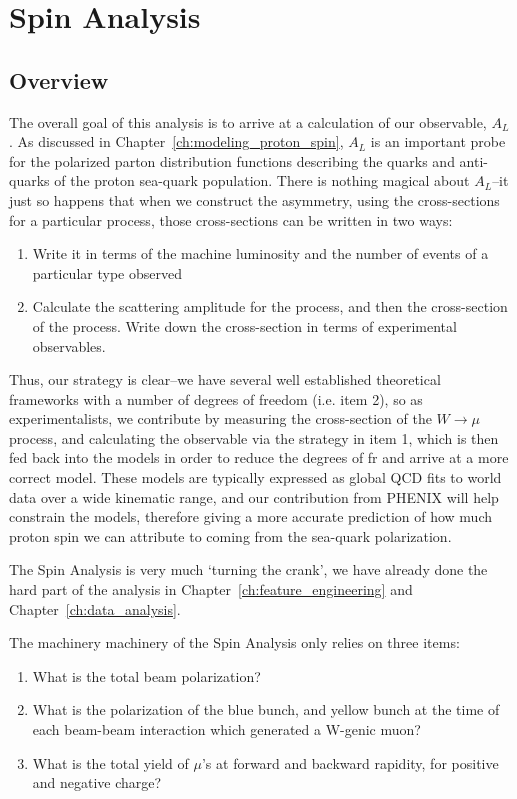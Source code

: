 \chapter{Spin Analysis}
\label{ch:spin_analysis}
\section{Overview}

The overall goal of this analysis is to arrive at a calculation of our
observable, $A_L$. As discussed in Chapter~\ref{ch:modeling_proton_spin}, $A_L$
is an important probe for the polarized parton distribution functions describing
the quarks and anti-quarks of the proton sea-quark population. There is nothing
magical about $A_L$--it just so happens that when we construct the asymmetry,
using the cross-sections for a particular process, those cross-sections can be
written in two ways:

\begin{enumerate}
  \item Write it in terms of the machine luminosity and the number of events of
    a particular type observed
  \item Calculate the scattering amplitude for the process, and then the
    cross-section of the process. Write down the cross-section in terms of
    experimental observables.
\end{enumerate}

Thus, our strategy is clear--we have several well established theoretical
frameworks with a number of degrees of freedom (i.e. item 2), so as
experimentalists, we contribute by measuring the cross-section of the
$W\rightarrow\mu$ process, and calculating the observable via the strategy in
item 1, which is then fed back into the models in order to reduce the degrees of
fr and arrive at a more correct model. These models are typically expressed as
global QCD fits to world data over a wide kinematic range, and our contribution
from PHENIX will help constrain the models, therefore giving a more accurate
prediction of how much proton spin we can attribute to coming from the sea-quark
polarization.

The Spin Analysis is very much `turning the crank', we have already done the
hard part of the analysis in Chapter~\ref{ch:feature_engineering} and
Chapter~\ref{ch:data_analysis}. 

{\noindent}The machinery machinery of the Spin Analysis only relies on three items:

\begin{enumerate}
  \item What is the total beam polarization?
  \item What is the polarization of the blue bunch, and yellow bunch at the
    time of each beam-beam interaction which generated a W-genic muon?
  \item What is the total yield of $\mu$'s at forward and backward rapidity,
    for positive and negative charge?
\end{enumerate}


